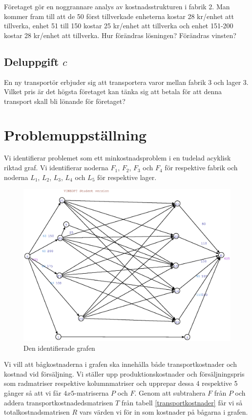 \documentclass[titlepage, a4paper]{article}
\begin{document}
Företaget gör en noggrannare analys av kostnadsstrukturen i fabrik 2. Man kommer fram till att de 50 först tillverkade enheterna kostar 28 kr/enhet att tillverka, enhet 51 till 150 kostar 25 kr/enhet att tillverka och enhet 151-200 kostar 28 kr/enhet att tillverka. Hur förändras lösningen? Förändras vinsten?

\subsection{Deluppgift $c$}

En ny transportör erbjuder sig att transportera varor mellan fabrik 3 och lager 3. Vilket pris är det högsta företaget kan tänka sig att betala för att denna transport skall bli lönande för företaget?

\section{Problemuppställning}

Vi identifierar problemet som ett minkostnadsproblem i en tudelad acyklisk riktad graf. Vi identifierar noderna $F_{1}$, $F_{2}$, $F_{3}$ och $F_{4}$ för respektive fabrik och noderna $L_{1}$, $L_{2}$, $L_{3}$, $L_{4}$ och $L_{5}$ för respektive lager.

\begin{figure}[h!]
    \centerline{\includegraphics[scale=0.65]{laborationsuppgift_13a_original.ps}}
    \caption{Den identifierade grafen}
\end{figure}

Vi vill att bågkostnaderna i grafen ska innehålla både transportkostnader och kostnad vid försäljning. Vi ställer upp produktionskostnader och försäljningspris som radmatriser respektive kolumnmatriser och upprepar dessa 4 respektive 5 gånger så att vi får $4x5$-matriserna $P$ och $F$. Genom att subtrahera $F$ från $P$ och addera transportkostnadedsmatrisen $T$ från tabell \ref{transportkostnader} får vi så totalkostnadsmatrisen $R$ vars värden vi för in som kostnader på bågarna i grafen.
\end{document}
